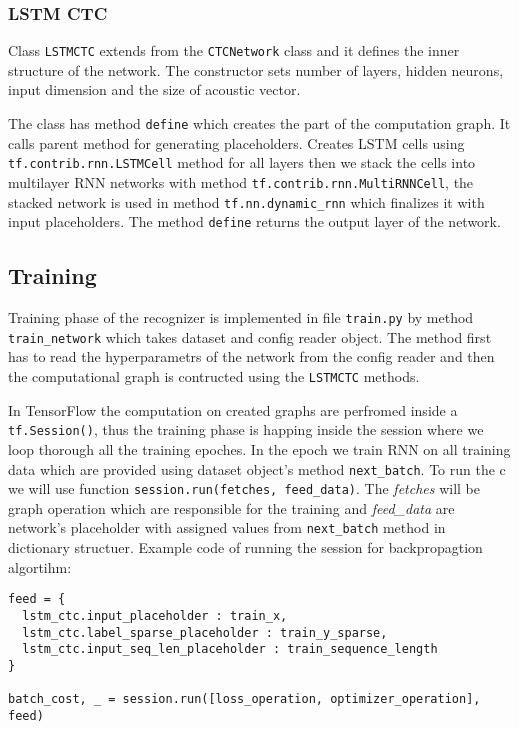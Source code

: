 \subsubsection{LSTM CTC}

Class \texttt{LSTMCTC} extends from the \texttt{CTCNetwork} class and it defines the inner structure of the network.
The constructor sets number of layers, hidden neurons, input dimension and the size of acoustic vector.

The class has method \texttt{define} which creates the part of the computation graph.
It calls parent method for generating placeholders.
Creates LSTM cells using \texttt{tf.contrib.rnn.LSTMCell} method for all layers then we stack the cells into multilayer RNN networks with method \texttt{tf.contrib.rnn.MultiRNNCell}, the stacked network is used in method \texttt{tf.nn.dynamic\_rnn} which finalizes it with input placeholders.
The method \texttt{define} returns the output layer of the network.

\subsection{Training}

Training phase of the recognizer is implemented in file \texttt{train.py} by method \texttt{train\_network} which takes dataset and config reader object.
The method first has to read the hyperparametrs of the network from the config reader and then the computational graph is contructed using the \texttt{LSTMCTC} methods.

In TensorFlow the computation on created graphs are perfromed inside a \texttt{tf.Session()}, thus the training phase is happing inside the session where we loop thorough all the training epoches.
In the epoch we train RNN on all training data which are provided using dataset object's method \texttt{next\_batch}.
To run the c we will use function \texttt{session.run(fetches, feed\_data)}. The \textit{fetches} will be graph operation which are responsible for the training and \textit{feed\_data} are network's placeholder with assigned values from \texttt{next\_batch} method in dictionary structuer.
Example code of running the session for backpropagtion algortihm:

\begin{lstlisting}
feed = {
  lstm_ctc.input_placeholder : train_x,
  lstm_ctc.label_sparse_placeholder : train_y_sparse,
  lstm_ctc.input_seq_len_placeholder : train_sequence_length
}

batch_cost, _ = session.run([loss_operation, optimizer_operation], feed)
\end{lstlisting}

